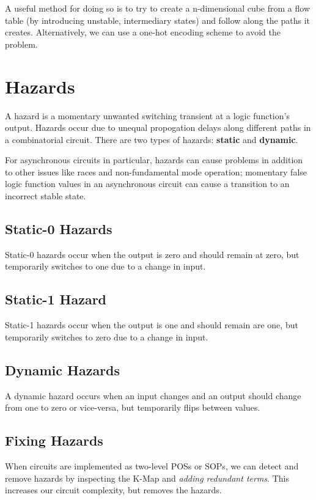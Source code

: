 \documentclass[12pt]{article}
\begin{document}
A useful method for doing so is to try to create a n-dimensional cube from a flow table (by introducing unstable, intermediary states) and follow along the paths it creates. Alternatively, we can use a one-hot encoding scheme to avoid the problem.

\section*{Hazards}
A hazard is a momentary unwanted switching transient at a logic function's output. Hazards occur due to unequal propogation delays along different paths in a combinatorial circuit. There are two types of hazards: {\bf static} and {\bf dynamic}.

For asynchronous circuits in particular, hazards can cause problems in addition to other issues like races and non-fundamental mode operation; momentary false logic function values in an asynchronous circuit can cause a transition to an incorrect stable state.

\subsection*{Static-0 Hazards}
Static-0 hazards occur when the output is zero and should remain at zero, but temporarily switches to one due to a change in input.

\subsection*{Static-1 Hazard}
Static-1 hazards occur when the output is one and should remain are one, but temporarily switches to zero due to a change in input.

\subsection*{Dynamic Hazards}
A dynamic hazard occurs when an input changes and an output should change from one to zero or vice-versa, but temporarily flips between values.

\subsection*{Fixing Hazards}
When circuits are implemented as two-level POSs or SOPs, we can detect and remove hazards by inspecting the K-Map and \emph{adding redundant terms}. This increases our circuit complexity, but removes the hazards.
\end{document}
